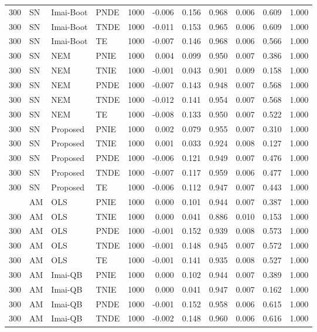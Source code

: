 \begin{longtable}{rlllrrrrrrr}
300 & SN & Imai-Boot & PNDE & 1000 & -0.006 & 0.156 & 0.968 & 0.006 & 0.609 & 1.000 \\
300 & SN & Imai-Boot & TNDE & 1000 & -0.011 & 0.153 & 0.965 & 0.006 & 0.609 & 1.000 \\
300 & SN & Imai-Boot & TE & 1000 & -0.007 & 0.146 & 0.968 & 0.006 & 0.566 & 1.000 \\
300 & SN & NEM & PNIE & 1000 & 0.004 & 0.099 & 0.950 & 0.007 & 0.386 & 1.000 \\
300 & SN & NEM & TNIE & 1000 & -0.001 & 0.043 & 0.901 & 0.009 & 0.158 & 1.000 \\
300 & SN & NEM & PNDE & 1000 & -0.007 & 0.143 & 0.948 & 0.007 & 0.568 & 1.000 \\
300 & SN & NEM & TNDE & 1000 & -0.012 & 0.141 & 0.954 & 0.007 & 0.568 & 1.000 \\
300 & SN & NEM & TE & 1000 & -0.008 & 0.133 & 0.950 & 0.007 & 0.522 & 1.000 \\
300 & SN & Proposed & PNIE & 1000 & 0.002 & 0.079 & 0.955 & 0.007 & 0.310 & 1.000 \\
300 & SN & Proposed & TNIE & 1000 & 0.001 & 0.033 & 0.924 & 0.008 & 0.127 & 1.000 \\
300 & SN & Proposed & PNDE & 1000 & -0.006 & 0.121 & 0.949 & 0.007 & 0.476 & 1.000 \\
300 & SN & Proposed & TNDE & 1000 & -0.007 & 0.117 & 0.959 & 0.006 & 0.477 & 1.000 \\
300 & SN & Proposed & TE & 1000 & -0.006 & 0.112 & 0.947 & 0.007 & 0.443 & 1.000 \\
\pagebreak
300 & AM & OLS & PNIE & 1000 & 0.000 & 0.101 & 0.944 & 0.007 & 0.387 & 1.000 \\
300 & AM & OLS & TNIE & 1000 & 0.000 & 0.041 & 0.886 & 0.010 & 0.153 & 1.000 \\
300 & AM & OLS & PNDE & 1000 & -0.001 & 0.152 & 0.939 & 0.008 & 0.573 & 1.000 \\
300 & AM & OLS & TNDE & 1000 & -0.001 & 0.148 & 0.945 & 0.007 & 0.572 & 1.000 \\
300 & AM & OLS & TE & 1000 & -0.001 & 0.141 & 0.935 & 0.008 & 0.527 & 1.000 \\
300 & AM & Imai-QB & PNIE & 1000 & 0.000 & 0.102 & 0.944 & 0.007 & 0.389 & 1.000 \\
300 & AM & Imai-QB & TNIE & 1000 & 0.000 & 0.041 & 0.947 & 0.007 & 0.162 & 1.000 \\
300 & AM & Imai-QB & PNDE & 1000 & -0.001 & 0.152 & 0.958 & 0.006 & 0.615 & 1.000 \\
300 & AM & Imai-QB & TNDE & 1000 & -0.002 & 0.148 & 0.960 & 0.006 & 0.616 & 1.000 \\

\end{longtable}
